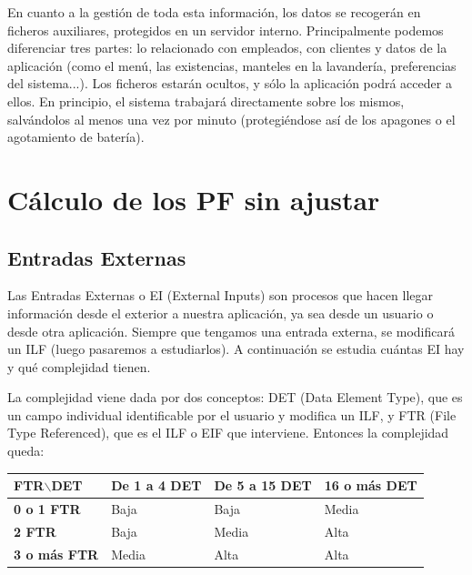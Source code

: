 \documentclass[spanish,a4paper,11pt, twoside]{report}	%
\begin{document}
En cuanto a la gestión de toda esta información, los datos se recogerán en ficheros auxiliares, protegidos en un servidor interno. Principalmente podemos diferenciar tres partes: lo relacionado con empleados, con clientes y datos de la aplicación (como el menú, las existencias, manteles en la lavandería, preferencias del sistema...). Los ficheros estarán ocultos, y sólo la aplicación podrá acceder a ellos. En principio, el sistema trabajará directamente sobre los mismos, salvándolos al menos una vez por minuto (protegiéndose así de los apagones o el agotamiento de batería).

\section{Cálculo de los PF sin ajustar}
	\subsection{Entradas Externas}
	Las Entradas Externas o EI (External Inputs) son procesos que hacen llegar información desde el exterior a nuestra aplicación, ya sea desde un usuario o desde otra aplicación. Siempre que tengamos una entrada externa, se modificará un ILF (luego pasaremos a estudiarlos). A continuación se estudia cuántas EI hay y qué complejidad tienen. 

	La complejidad viene dada por dos conceptos: DET (Data Element Type), que es un campo individual identificable por el usuario y modifica un ILF, y FTR (File Type Referenced), que es el ILF o EIF que interviene. Entonces la complejidad queda: 

\vspace{0.35cm}
			\begin{tabular}{|p{3cm}||p{3cm}|p{3.2cm}|p{3cm}|}
				\hline
				\textbf{FTR$\backslash$DET} & \textbf{De 1 a 4 DET} & \textbf{De 5 a 15 DET} & \textbf{16  o más DET} \\ \hline \hline
				\textbf{0 o 1 FTR} & Baja & Baja & Media \\ \hline 
				\textbf{2 FTR} & Baja & Media & Alta \\ \hline 
				\textbf{3 o más FTR} & Media & Alta & Alta \\ \hline 
			\end{tabular}

\vspace{0.35cm}
\end{document}
